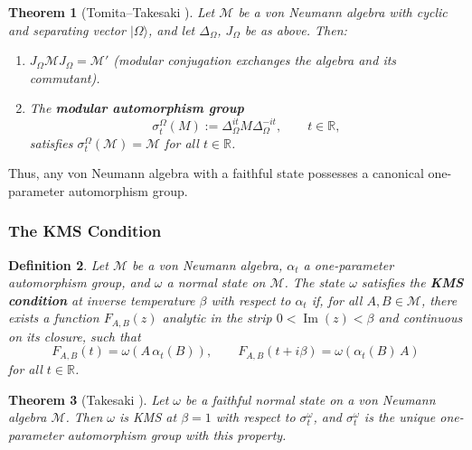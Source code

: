 \documentclass[12pt,a4paper,openany]{book}
\newtheorem{theorem}{Theorem}[chapter]
\newtheorem{definition}[theorem]{Definition}
\begin{document}
\begin{theorem}[Tomita--Takesaki {\cite{Takesaki2003}}]
\label{H-D-thm:TT}
Let $\mathcal{M}$ be a von Neumann algebra with cyclic and separating vector $|\Omega\rangle$, and let $\Delta_\Omega$, $J_\Omega$ be as above. Then:
\begin{enumerate}
\item[(a)] $J_\Omega \mathcal{M} J_\Omega = \mathcal{M}'$ (modular conjugation exchanges the algebra and its commutant).
\item[(b)] The \textbf{modular automorphism group}
\begin{equation}
\sigma_t^\Omega(M) := \Delta_\Omega^{it} M \Delta_\Omega^{-it}, \qquad t \in \mathbb{R},
\end{equation}
satisfies $\sigma_t^\Omega(\mathcal{M}) = \mathcal{M}$ for all $t \in \mathbb{R}$.
\end{enumerate}
\end{theorem}

Thus, any von Neumann algebra with a faithful state possesses a canonical one-parameter automorphism group.

\subsubsection{The KMS Condition}

\begin{definition}
Let $\mathcal{M}$ be a von Neumann algebra, $\alpha_t$ a one-parameter automorphism group, and $\omega$ a normal state on $\mathcal{M}$.
The state $\omega$ satisfies the \textbf{KMS condition} at inverse temperature $\beta$ with respect to $\alpha_t$ if, for all $A, B \in \mathcal{M}$, there exists a function $F_{A,B}(z)$ analytic in the strip $0 < \operatorname{Im}(z) < \beta$ and continuous on its closure, such that
\begin{equation}
F_{A,B}(t) = \omega(A \,\alpha_t(B)), \qquad F_{A,B}(t + i\beta) = \omega(\alpha_t(B)\, A)
\end{equation}
for all $t \in \mathbb{R}$.
\end{definition}

\begin{theorem}[Takesaki {\cite{Takesaki2003}}]
\label{H-D-thm:KMS-unique}
Let $\omega$ be a faithful normal state on a von Neumann algebra $\mathcal{M}$.
Then $\omega$ is KMS at $\beta = 1$ with respect to $\sigma_t^\omega$, and $\sigma_t^\omega$ is the \emph{unique} one-parameter automorphism group with this property.
\end{theorem}
\end{document}
